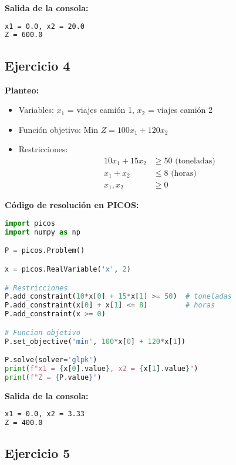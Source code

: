 \documentclass[12pt]{article}
\begin{document}
\textbf{Salida de la consola:}
\begin{lstlisting}[language=bash,backgroundcolor=\color{black},basicstyle=\color{white}\ttfamily,numbers=none]
x1 = 0.0, x2 = 20.0
Z = 600.0
\end{lstlisting}

\subsection*{Ejercicio 4}

\textbf{Planteo:}
\begin{itemize}
\item Variables: $x_1$ = viajes camión 1, $x_2$ = viajes camión 2
\item Función objetivo: Min $Z = 100x_1 + 120x_2$
\item Restricciones:
  \begin{align*}
  10x_1 + 15x_2 &\geq 50 \text{ (toneladas)} \\
  x_1 + x_2 &\leq 8 \text{ (horas)} \\
  x_1, x_2 &\geq 0
  \end{align*}
\end{itemize}

\textbf{Código de resolución en PICOS:}
\begin{lstlisting}[language=Python]
import picos
import numpy as np

P = picos.Problem()

x = picos.RealVariable('x', 2)

# Restricciones
P.add_constraint(10*x[0] + 15*x[1] >= 50)  # toneladas
P.add_constraint(x[0] + x[1] <= 8)         # horas
P.add_constraint(x >= 0)

# Funcion objetivo
P.set_objective('min', 100*x[0] + 120*x[1])

P.solve(solver='glpk')
print(f"x1 = {x[0].value}, x2 = {x[1].value}")
print(f"Z = {P.value}")
\end{lstlisting}

\textbf{Salida de la consola:}
\begin{lstlisting}[language=bash,backgroundcolor=\color{black},basicstyle=\color{white}\ttfamily,numbers=none]
x1 = 0.0, x2 = 3.33
Z = 400.0
\end{lstlisting}

\subsection*{Ejercicio 5}
\end{document}

